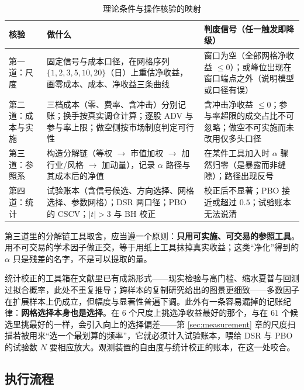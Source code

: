 \begin{table}[htbp]
\centering
\caption{理论条件与操作核验的映射}
\label{tab:gates}
\begin{tabular}{@{}>{\raggedright\arraybackslash}p{2.5cm}>{\raggedright\arraybackslash}p{5.6cm}>{\raggedright\arraybackslash}p{6.0cm}@{}}
\toprule
核验 & 做什么 & 判废信号（任一触发即降级） \\
\midrule
第一道：尺度 & 固定信号与成本口径，在网格序列 $\{1,2,3,5,10,20\}$（日）上重估净收益，画零成本、成本、净收益三条曲线 & 窗口为空（全部网格净收益 $\le 0$）；或峰位出现在窗口端点之外（说明模型或口径有误） \\[0.3em]
第二道：成本与实施 & 三档成本（零、费率、含冲击）分别记账；换手按真实调仓计算；逐股 ADV 与参与率上限；做空侧按市场制度判定可行性 & 含冲击净收益 $\le 0$；参与率超限的成交占比不可忽略；做空不可实施而未改用仅多头口径 \\[0.3em]
第三道：参照系 & 构造分解链（等权 $\to$ 市值加权 $\to$ 加行业/风格 $\to$ 加动量），记录 $\alpha$ 路径与其成本后的净值 & 在某件工具加入时 $\alpha$ 骤然归零（是暴露而非缝隙）；路径出现反号 \\[0.3em]
第四道：统计 & 试验账本（含信号候选、方向选择、网格选择、参数网格）；DSR 两口径；PBO 的 CSCV；$|t|>3$ 与 BH 校正 & 校正后不显著；PBO 接近或超过 $0.5$；试验账本无法说清 \\
\bottomrule
\end{tabular}
\end{table}

第三道里的分解链工具取舍，应当遵一个原则：\textbf{只用可实施、可交易的参照工具}。用不可交易的学术因子做正交，等于用纸上工具抹掉真实收益；这类“净化”得到的 $\alpha$ 只是残差的名字，不是可以提取的量。

统计校正的工具箱在文献里已有成熟形式——现实检验与高门槛\cite{white2000,sullivan1999,harveylz2016}、缩水夏普\cite{bailey2014dsr}与回测过拟合概率\cite{bailey2016pbo}，此处不重复推导；跨样本的复制研究给出的图景更细致——多数因子在扩展样本上仍成立，但幅度与显著性普遍下调\cite{jensen2023}。此外有一条容易漏掉的记账纪律：\textbf{网格选择本身也是选择}。在 $6$ 个尺度上挑选净收益最好的那个，与在 $61$ 个候选里挑最好的一样，会引入向上的选择偏差——第 \ref{sec:measurement} 章的尺度扫描若被用来“选一个最划算的频率”，它就必须计入试验账本，喂给 DSR 与 PBO 的试验数 $N$ 要相应放大。观测装置的自由度与统计校正的账本，在这一处咬合。

\subsection{执行流程}\label{sec:pipeline}

